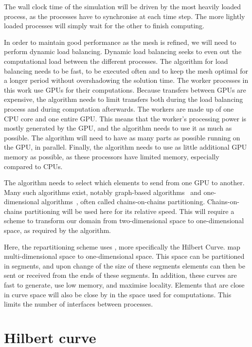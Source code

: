 The wall clock time of the simulation will be driven by the most heavily loaded process, as the
processes have to synchronise at each time step. The more lightly loaded processes will simply wait
for the other to finish computing.

In order to maintain good performance as the mesh is refined, we will need to perform dynamic load
balancing. Dynamic load balancing seeks to even out the computational load between the different
processes. The algorithm for load balancing needs to be fast, to be executed often and to keep the
mesh optimal for a longer period without overshadowing the solution time. The worker processes in
this work use GPUs for their computations. Because transfers between GPUs are expensive, the
algorithm needs to limit transfers both during the load balancing process and during computation
afterwards. The workers are made up of one CPU core and one entire GPU. This means that the worker's
processing power is mostly generated by the GPU, and the algorithm needs to use it as much as
possible. The algorithm will need to have as many parts as possible running on the GPU, in parallel.
Finally, the algorithm needs to use as little additional GPU memory as possible, as these processors
have limited memory, especially compared to CPUs.

The algorithm needs to select which elements to send from one GPU to another. Many such algorithms
exist, notably graph-based algorithms~\cite{Karypis1998} and one-dimensional
algorithms~\cite{Pinar2004}, often called chains-on-chains partitioning. Chains-on-chains
partitioning will be used here for its relative speed. This will require a scheme to transform our
domain from two-dimensional space to one-dimensional space, as required by the algorithm.

Here, the repartitioning scheme uses \textit{}, more specifically the Hilbert
Curve.  map multi-dimensional space to one-dimensional space. This space can be
partitioned in segments, and upon change of the size of these segments elements can then be sent or
received from the ends of these segments. In addition, these curves are fast to generate, use low
memory, and maximise locality. Elements that are close in curve space will also be close by in the
space used for computations. This limits the number of interfaces between processes.

\section{Hilbert curve} \label{section:load_balancing:hilbert_curve}

